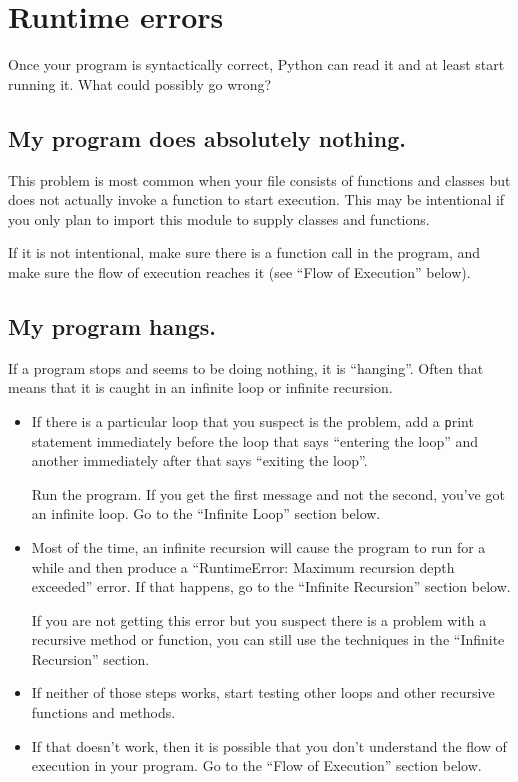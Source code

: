 \documentclass[
DIV=11,
fontsize=13,
twoside,
headinclude=false,
titlepage=firstiscover,
abstract=true,
headsepline=true,
footsepline=true,
chapterprefix=true, %
headings=big,
bibliography=totoc,%
captions=tableheading
]{scrbook}
\theoremstyle{definition}
\begin{document}
\section{Runtime errors}

Once your program is syntactically correct,
Python can read it and at least start running it.  What could
possibly go wrong?


\subsection{My program does absolutely nothing.}

This problem is most common when your file consists of functions and
classes but does not actually invoke a function to start execution.
This may be intentional if you only plan to import this module to
supply classes and functions.

If it is not intentional, make sure there is a function call
in the program, and make sure the flow of execution reaches
it (see ``Flow of Execution'' below).


\subsection{My program hangs.}

If a program stops and seems to be doing nothing, it is ``hanging''.
Often that means that it is caught in an infinite loop or infinite
recursion.

\begin{itemize}

\item If there is a particular loop that you suspect is the
problem, add a {\texttt print} statement immediately before the loop that says
``entering the loop'' and another immediately after that says
``exiting the loop''.

Run the program.  If you get the first message and not the second,
you've got an infinite loop.  Go to the ``Infinite Loop'' section
below.

\item Most of the time, an infinite recursion will cause the program
to run for a while and then produce a ``RuntimeError: Maximum
recursion depth exceeded'' error.  If that happens, go to the
``Infinite Recursion'' section below.

If you are not getting this error but you suspect there is a problem
with a recursive method or function, you can still use the techniques
in the ``Infinite Recursion'' section.

\item If neither of those steps works, start testing other
loops and other recursive functions and methods.

\item If that doesn't work, then it is possible that
you don't understand the flow of execution in your program.
Go to the ``Flow of Execution'' section below.

\end{itemize}
\end{document}

